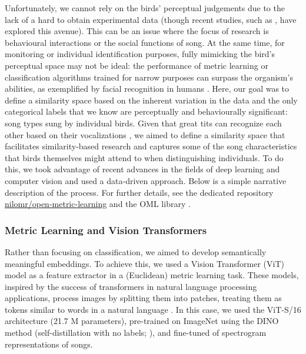 Unfortunately, we cannot rely on the birds' perceptual judgements due to the lack of a hard to obtain experimental data (though recent studies, such as \cite{morfi2021, zandberg2022}, have explored this avenue). This can be an issue where the focus of research is behavioural interactions or the social functions of song. At the same time, for monitoring or individual identification purposes, fully mimicking the bird's perceptual space may not be ideal: the performance of metric learning or classification algorithms trained for narrow purposes can surpass the organism's abilities, as exemplified by facial recognition in humans \parencite{lu2014}. Here, our goal was to define a similarity space based on the inherent variation in the data and the only categorical labels that we know are perceptually and behaviourally significant: song types sung by individual birds. Given that great tits can recognize each other based on their vocalizations \parencite{lind1996}, we aimed to define a similarity space that facilitates similarity-based research and captures some of the song characteristics that birds themselves might attend to when distinguishing individuals. To do this, we took advantage of recent advances in the fields of deep learning and computer vision and used a data-driven approach. Below is a simple narrative description of the process. For further details, see the dedicated repository \href{https://github.com/nilomr/open-metric-learning/tree/great-tit}{nilomr/open-metric-learning} and the OML library \parencite{shabanov2023}. 


\subsubsection{Metric Learning and Vision Transformers}
Rather than focusing on classification, we aimed to develop semantically meaningful embeddings. To achieve this, we used a Vision Transformer (ViT) model as a feature extractor in a (Euclidean) metric learning task. These models, inspired by the success of transformers in natural language processing applications, process images by splitting them into patches, treating them as tokens similar to words in a natural language \parencite{dosovitskiy2021, raghu2022}. In this case, we used the ViT-S/16 architecture (21.7 M parameters), pre-trained on ImageNet using the DINO method (self-distillation with no labels; \cite{caron2021}), and fine-tuned of spectrogram representations of songs.

